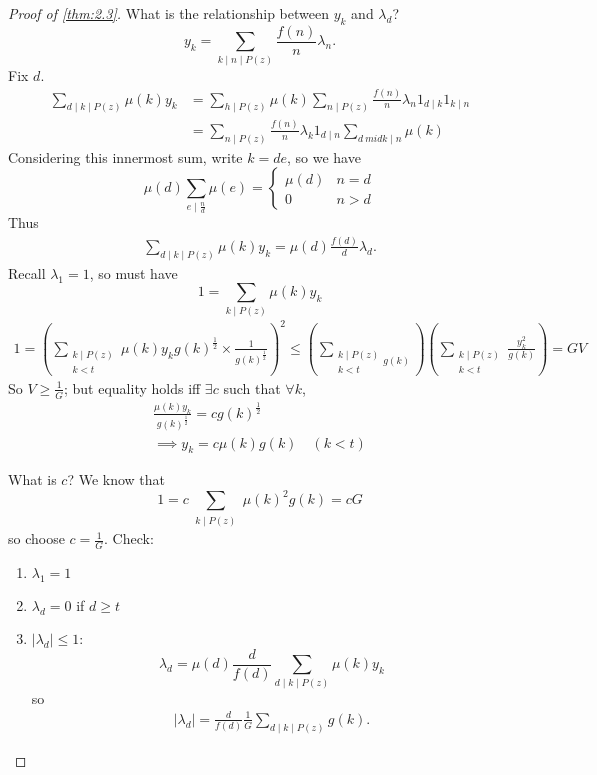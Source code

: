 \documentclass{article}
\newcommand{\1}{\mathbbm{1}}
\begin{document}
\begin{proof}[Proof of \cref{thm:2.3}]
What is the relationship between $y_k$ and $\lambda_d$?
\begin{equation*}
  y_k = \sum_{k \mid n \mid P(z)} \frac{f(n)}{n} \lambda_n.
\end{equation*}
Fix $d$.
\begin{align*}
  \sum_{d \mid k \mid P(z)} \mu(k) y_k &= \sum_{h \mid P(z)} \mu(k) \sum_{n \mid P(z)} \frac{f(n)}{n} \lambda_n 1_{d \mid k} 1_{k \mid n} \\
                                       &= \sum_{n \mid P(z)} \frac{f(n)}{n} \lambda_{k} 1_{d \mid n} \sum_{d\ mid k \mid n} \mu(k)
\end{align*}
Considering this innermost sum, write $k = de$, so we have
\begin{equation*}
  \mu(d) \sum_{e \mid \frac{n}{d}} \mu(e) =
  \begin{cases}
    \mu(d) & n = d \\
    0 & n > d
  \end{cases}
\end{equation*}
Thus
\begin{align*}
  \sum_{d \mid k \mid P(z)} \mu(k) y_k = \mu(d) \frac{f(d)}{d} \lambda_d.
\end{align*}
Recall $\lambda_1=1$, so must have
\begin{equation*}1 = \sum_{k \mid P(z)} \mu(k) y_k\end{equation*}
\begin{align*}
  1 = \left(\sum_{\substack{k \mid P(z) \\ k < t}} \mu(k) y_k g(k)^{\frac 12} \times \frac{1}{g(k)^{\frac 12}}\right)^2 \leq \left(\sum_{\substack{k \mid P(z) \\ k<t} g(k)}\right) \left(\sum_{\substack{k \mid P(z) \\ k < t}} \frac{y_k^2}{g(k)}\right) = GV
\end{align*}
So $V \geq \frac{1}{G}$; but equality holds iff $\exists c$ such that $\forall k$,
\begin{align*}
  \frac{\mu(k) y_k}{g(k)^{\frac{1}{2}}} = c g(k)^{\frac 12} \\
  \implies y_k = c \mu(k) g(k) \quad (k < t)
\end{align*}

What is $c$? We know that
\begin{equation*}
  1 = c \sum_{\substack{k \mid P(z)}} \mu(k)^2 g(k) = cG
\end{equation*}
so choose $c = \frac{1}{G}$. Check:
\begin{enumerate}
  \item $\lambda_1 = 1$ \checkmark
  \item $\lambda_d = 0$ if $d \geq t$ \checkmark
  \item $|\lambda_d| \leq 1$:
    \begin{equation*}
      \lambda_d = \mu(d) \frac{d}{f(d)} \sum_{d \mid k \mid P(z)} \mu(k) y_k
    \end{equation*}
    so
    \begin{align*}
      |\lambda_d| = \frac{d}{f(d)} \frac{1}{G} \sum_{d \mid k \mid P(z)} g(k).
    \end{align*}


\end{enumerate}
\end{proof}
\end{document}
